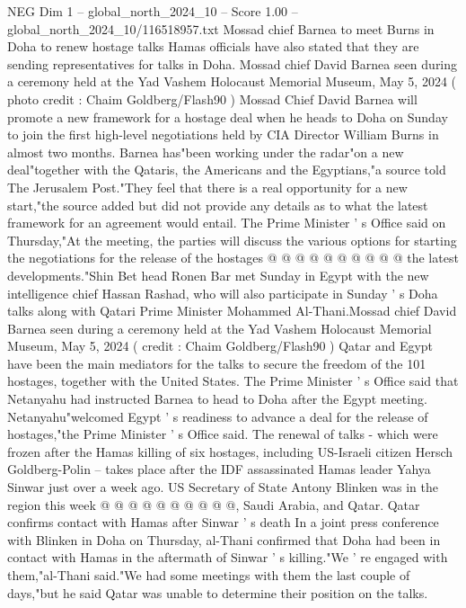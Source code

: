 \begin{textsample}{NEG Dim 1 – global\_north\_2024\_10 – Score 1.00 – global\_north\_2024\_10/116518957.txt}  \label{ex:f1_neg_072}
Mossad chief Barnea to meet Burns in Doha to renew hostage talks Hamas officials have also stated that they are sending representatives for talks in Doha.
Mossad chief David Barnea seen during a ceremony held at the Yad Vashem Holocaust Memorial Museum, May 5, 2024 ( photo credit : Chaim Goldberg/Flash90 ) Mossad Chief David Barnea will promote a new framework for a hostage deal when he heads to Doha on Sunday to join the first high-level negotiations held by CIA Director William Burns in almost two months.
Barnea has"been working under the radar"on a new deal"together with the Qataris, the Americans and the Egyptians,"a source told The Jerusalem Post."They feel that there is a real opportunity for a new start,"the source added but did not provide any details as to what the latest framework for an agreement would entail.
The Prime Minister ' s Office said on Thursday,"At the meeting, the parties will discuss the various options for starting the negotiations for the release of the hostages @ @ @ @ @ @ @ @ @ @ the latest developments."Shin Bet head Ronen Bar met Sunday in Egypt with the new intelligence chief Hassan Rashad, who will also participate in Sunday ' s Doha talks along with Qatari Prime Minister Mohammed Al-Thani.Mossad chief David Barnea seen during a ceremony held at the Yad Vashem Holocaust Memorial Museum, May 5, 2024 ( credit : Chaim Goldberg/Flash90 ) Qatar and Egypt have been the main mediators for the talks to secure the freedom of the 101 hostages, together with the United States.
The Prime Minister ' s Office said that Netanyahu had instructed Barnea to head to Doha after the Egypt meeting.
Netanyahu"welcomed Egypt ' s readiness to advance a deal for the release of hostages,"the Prime Minister ' s Office said.
The renewal of talks - which were frozen after the Hamas killing of six hostages, including US-Israeli citizen Hersch Goldberg-Polin -- takes place after the IDF assassinated Hamas leader Yahya Sinwar just over a week ago.
US Secretary of State Antony Blinken was in the region this week @ @ @ @ @ @ @ @ @ @, Saudi Arabia, and Qatar.
Qatar confirms contact with Hamas after Sinwar ' s death In a joint press conference with Blinken in Doha on Thursday, al-Thani confirmed that Doha had been in contact with Hamas in the aftermath of Sinwar ' s killing."We ' re engaged with them,"al-Thani said."We had some meetings with them the last couple of days,"but he said Qatar was unable to determine their position on the talks.

\end{textsample}
